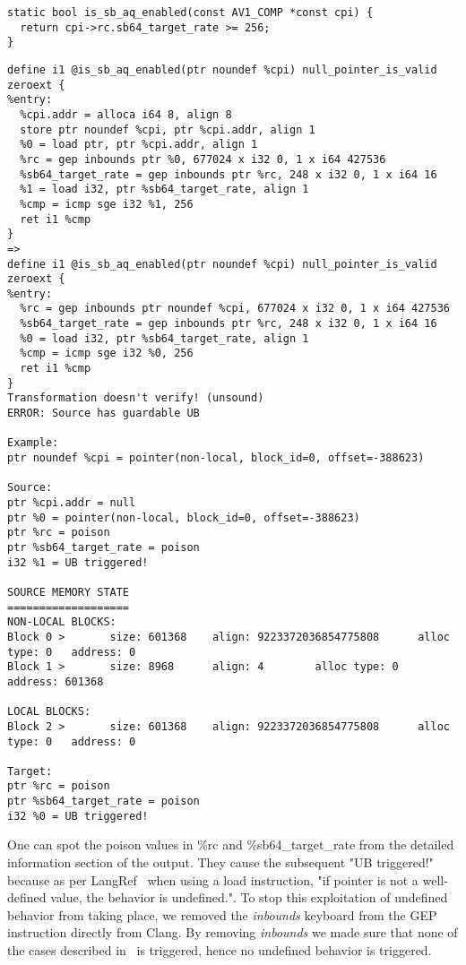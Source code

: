 \begin{lstlisting}[style=Cstyle, caption={C code for is_sb_aq_enabled}, label={lst:is_sb_aq_enabled_c_code}]
static bool is_sb_aq_enabled(const AV1_COMP *const cpi) {
  return cpi->rc.sb64_target_rate >= 256;
}
\end{lstlisting}

\begin{lstlisting}[caption={Alive2 output on is_sb_aq_enabled}, label={lst:is_sb_aq_enabled_alive}]
define i1 @is_sb_aq_enabled(ptr noundef %cpi) null_pointer_is_valid zeroext {
%entry:
  %cpi.addr = alloca i64 8, align 8
  store ptr noundef %cpi, ptr %cpi.addr, align 1
  %0 = load ptr, ptr %cpi.addr, align 1
  %rc = gep inbounds ptr %0, 677024 x i32 0, 1 x i64 427536
  %sb64_target_rate = gep inbounds ptr %rc, 248 x i32 0, 1 x i64 16
  %1 = load i32, ptr %sb64_target_rate, align 1
  %cmp = icmp sge i32 %1, 256
  ret i1 %cmp
}
=>
define i1 @is_sb_aq_enabled(ptr noundef %cpi) null_pointer_is_valid zeroext {
%entry:
  %rc = gep inbounds ptr noundef %cpi, 677024 x i32 0, 1 x i64 427536
  %sb64_target_rate = gep inbounds ptr %rc, 248 x i32 0, 1 x i64 16
  %0 = load i32, ptr %sb64_target_rate, align 1
  %cmp = icmp sge i32 %0, 256
  ret i1 %cmp
}
Transformation doesn't verify! (unsound)
ERROR: Source has guardable UB

Example:
ptr noundef %cpi = pointer(non-local, block_id=0, offset=-388623)

Source:
ptr %cpi.addr = null
ptr %0 = pointer(non-local, block_id=0, offset=-388623)
ptr %rc = poison
ptr %sb64_target_rate = poison
i32 %1 = UB triggered!

SOURCE MEMORY STATE
===================
NON-LOCAL BLOCKS:
Block 0 >       size: 601368    align: 9223372036854775808      alloc type: 0   address: 0
Block 1 >       size: 8968      align: 4        alloc type: 0   address: 601368

LOCAL BLOCKS:
Block 2 >       size: 601368    align: 9223372036854775808      alloc type: 0   address: 0

Target:
ptr %rc = poison
ptr %sb64_target_rate = poison
i32 %0 = UB triggered!
\end{lstlisting}

One can spot the poison values in \%rc and \%sb64_target_rate from the detailed
information section of the output. They cause the subsequent "UB triggered!"
because as per
LangRef~\cite{load-semantics} when using a load instruction, "if pointer is not a
well-defined value, the behavior is undefined.". To stop this exploitation of
undefined behavior from taking place, we removed the \textit{inbounds} keyboard
from the GEP instruction directly from Clang. By removing \textit{inbounds} we
made sure that none of the cases described in~\cite{getelementptr-semantics} is
triggered, hence no undefined behavior is triggered.

